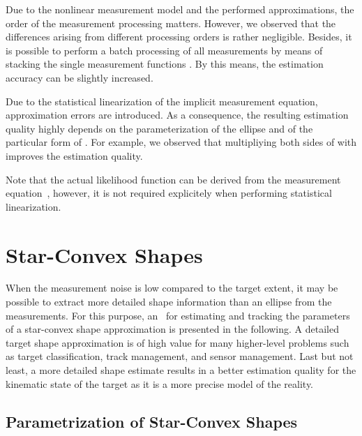 \documentclass[preprint,1p,11pt]{ISAS_IR}
\begin{document}
\begin{Remark}\label{rem:order}
 Due to the nonlinear measurement model and the performed approximations, the order of the measurement processing matters. However, we observed that the differences arising from different processing orders is rather negligible.
  Besides, it is possible to perform a batch processing of all measurements by means of stacking the single measurement functions . By this means, the estimation accuracy can be slightly increased.
\end{Remark}
\begin{Remark}\label{rem:approx_error}
Due to the statistical linearization of the implicit measurement equation, approximation errors are introduced. As a consequence, the resulting estimation quality highly  depends on the
parameterization of the ellipse and of the particular form of .
For example, we observed that multipliying both sides of   with  improves the estimation quality.
 \end{Remark}
\begin{Remark}
Note that the  actual likelihood function    can be derived from  the measurement equation~, however, it is not required explicitely when performing statistical linearization.
\end{Remark}


\chapter{Star-Convex Shapes}\label{sec:rhm_starconvex}
When the measurement noise is low compared to the target extent, it may be 
possible to extract more detailed shape information than an ellipse from the measurements. 
For this purpose, an \rhm\ for estimating and tracking the parameters of a star-convex  shape approximation is presented in the following. A detailed target shape approximation is of high value for many higher-level problems such as target classification,
track management, and  sensor management. Last but not least, a more detailed shape estimate results in a better estimation quality for the kinematic state of the target as it is a more precise model of the reality.


\section{Parametrization of Star-Convex Shapes} 
\end{document}
